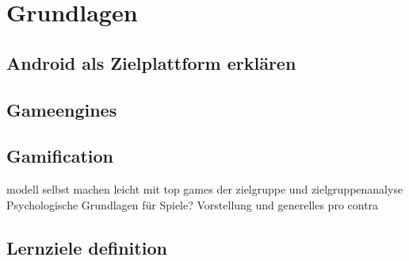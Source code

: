 \section{Grundlagen}
\subsection{Android als Zielplattform erklären}
\subsection{Gameengines}
\subsection{Gamification}
	modell selbst machen leicht mit top games der zielgruppe und zielgruppenanalyse
	Psychologische Grundlagen für Spiele?
	Vorstellung und generelles pro contra
\subsection{Lernziele definition}
